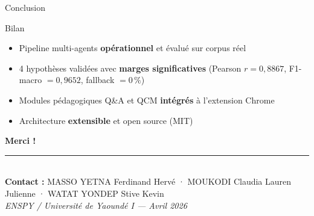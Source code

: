 \documentclass[aspectratio=169, 12pt]{beamer}
\begin{document}
\begin{frame}{Conclusion}

  \begin{block}{Bilan}
    \begin{itemize}
      \item Pipeline multi-agents \textbf{opérationnel} et évalué sur corpus réel
      \item 4 hypothèses validées avec \textbf{marges significatives}
            (Pearson $r = 0{,}8867$, F1-macro $= 0{,}9652$, fallback $= 0\,\%$)
      \item Modules pédagogiques Q\&A et QCM \textbf{intégrés} à l'extension Chrome
      \item Architecture \textbf{extensible} et open source (MIT)
    \end{itemize}
  \end{block}

  \vspace{0.4cm}

  \begin{center}
    {\Large\textbf{\textcolor{mainblue}{Merci !}}}\\[0.4em]
    \rule{0.5\linewidth}{0.4pt}\\[0.3em]
    \small
    \textbf{Contact :}
    MASSO YETNA Ferdinand Hervé ·
    MOUKODI Claudia Lauren Julienne ·
    WATAT YONDEP Stive Kevin\\[0.2em]
    \scriptsize\textit{ENSPY / Université de Yaoundé I — Avril 2026}
  \end{center}

\end{frame}
\end{document}
